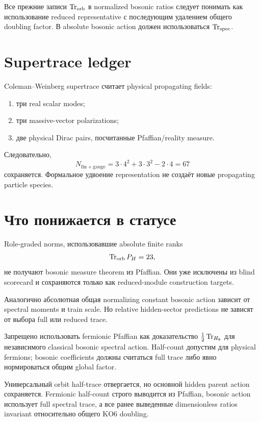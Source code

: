 Все прежние записи \(\operatorname{Tr}_{\mathrm{orb}}\) в normalized bosonic ratios
следует понимать как использование reduced representative с последующим
удалением общего doubling factor. В absolute bosonic action должен
использоваться \(\operatorname{Tr}_{\mathrm{spec}}\).

\section{Supertrace ledger}

Coleman--Weinberg supertrace считает physical propagating fields:
\begin{enumerate}
 \item три real scalar modes;
 \item три massive-vector polarizations;
 \item две physical Dirac pairs, посчитанные Pfaffian/reality measure.
\end{enumerate}
Следовательно,
\begin{equation}
 N_{\mathrm{fin+gauge}}
 =3\cdot4^2+3\cdot3^2-2\cdot4
 =67
\end{equation}
сохраняется. Формальное удвоение representation не создаёт новые
propagating particle species.

\section{Что понижается в статусе}

Role-graded norms, использовавшие absolute finite ranks
\begin{equation}
 \operatorname{Tr}_{\mathrm{orb}}P_H=23,
\end{equation}
не получают bosonic measure theorem из Pfaffian. Они уже исключены из
blind scorecard и сохраняются только как reduced-module construction
targets.

Аналогично абсолютная общая normalizing constant bosonic action зависит
от spectral moments и train scale. Но relative hidden-sector predictions
не зависят от выбора full или reduced trace.

\begin{nogocriterion}
Запрещено использовать fermionic Pfaffian как доказательство
\(\frac12\operatorname{Tr}_{H_8}\) для независимого classical bosonic spectral action.
Half-count допустим для physical fermions; bosonic coefficients должны
считаться full trace либо явно нормироваться общим global factor.
\end{nogocriterion}

\begin{theorem}
Универсальный orbit half-trace отвергается, но основной hidden parent
action сохраняется. Fermionic half-count строго выводится из Pfaffian,
bosonic action использует full spectral trace, а все ранее выведенные
dimensionless ratios invariant относительно общего KO6 doubling.
\end{theorem}


